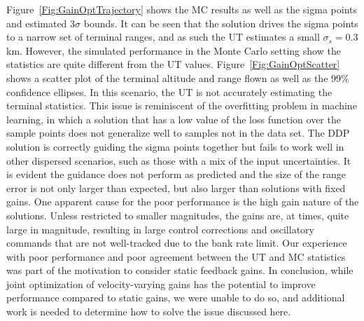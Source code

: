 Figure~\ref{Fig:GainOptTrajectory} shows the MC results as well as the sigma points and estimated 3$\sigma$ bounds. It can be seen that the solution drives the sigma points to a narrow set of terminal ranges, and as such the UT estimates a small $\sigma_s=0.3$ km. However, the simulated performance in the Monte Carlo setting show the statistics are quite different from the UT values. Figure~\ref{Fig:GainOptScatter} shows a scatter plot of the terminal altitude and range flown as well as the 99\% confidence ellipses. In this scenario, the UT is not accurately estimating the terminal statistics. This issue is reminiscent of the overfitting problem in machine learning, in which a solution that has a low value of the loss function over the sample points does not generalize well to samples not in the data set. The DDP solution is correctly guiding the sigma points together but fails to work well in other dispersed scenarios, such as those with a mix of the input uncertainties. It is evident the guidance does not perform as predicted and the size of the range error is not only larger than expected, but also larger than solutions with fixed gains. One apparent cause for the poor performance is the high gain nature of the solutions. Unless restricted to smaller magnitudes, the gains are, at times, quite large in magnitude, resulting in large control corrections and oscillatory commands that are not well-tracked due to the bank rate limit. Our experience with poor performance and poor agreement between the UT and MC statistics was part of the motivation to consider static feedback gains. In conclusion, while joint optimization of velocity-varying gains has the potential to improve performance compared to static gains, we were unable to do so, and additional work is needed to determine how to solve the issue discussed here.

